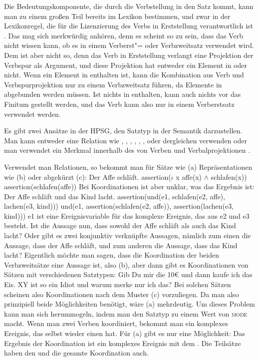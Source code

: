 Die Bedeutungskomponente, die durch die Verbstellung in den Satz kommt, kann man zu einem
großen Teil bereits im Lexikon bestimmen, und zwar in der Lexikonregel, die für die Lizenzierung
des Verbs in Erststellung verantwortlich ist \citep[]{Kiss95b}. Das mag sich merkwürdig anhören, denn es scheint
so zu sein, dass das Verb nicht wissen kann, ob es in einem Verberst"= oder Verbzweitsatz verwendet
wird. Dem ist aber nicht so, denn das Verb in Erststellung verlangt eine Projektion der Verbspur
als Argument, und diese Projektion hat entweder ein Element in \slasch oder nicht. Wenn ein Element
in \slasch enthalten ist, kann die Kombination aus Verb und Verbspurprojektion nur zu einem Verbzweitsatz
führen, da Elemente in \slasch abgebunden werden müssen. Ist nichts in \slasch enthalten, kann auch nichts
vor das Finitum gestellt werden, und das Verb kann also nur in einem Verberstsatz verwendet werden.

Es gibt zwei Ansätze in der HPSG, den Satztyp in der Semantik darzustellen. Man kann entweder eine
Relation wie , , ,
, , ,  oder dergleichen verwenden
\parencites[378, 380]{GSag2000a-u}[59]{Kathol2001a}[Abschnitt~6.1.4]{mrs}{MuellerSatztypen} oder
man verwendet ein Merkmal innerhalb des \indexwes von Verben und Verbalprojektionen
\parencites[107]{SagW99a-u}[144, 170]{Kathol2000a}.
\largerpage

Verwendet man Relationen, so bekommt man für Sätze wie (a) Repräsentationen wie (b)
oder abgekürzt (c):
\eal
\ex Der Affe schläft.
\ex assertion($\iota$ x affe(x) $\wedge{}$ schlafen(x))
\ex assertion(schlafen(affe))
\zl
Bei Koordinationen ist aber unklar, was das Ergebnis ist:
\eal
\ex Der Affe schläft und das Kind lacht.
\ex assertion(und(e1, schlafen(e2, affe), lachen(e3, kind)))
\ex und(e1, assertion(schlafen(e2, affe)), assertion(lachen(e3, kind)))
\zl
e1 ist eine Ereignisvariable für das komplexe Ereignis, das aus e2 und e3 besteht.
Ist die Aussage nun, dass sowohl der Affe schläft als auch das Kind lacht? Oder gibt es zwei konjunktiv
verknüpfte Aussagen, nämlich zum einen die Aussage, dass der Affe schläft, und zum anderen die
Aussage, dass das Kind lacht? Eigentlich möchte man sagen, dass die Koordination der beiden
Verbzweitsätze eine Aussage ist, also (b), aber dann gibt es Koordinationen von Sätzen mit
verschiedenen Satztypen:
\eal
\ex Gib Du mir die 10€ und dann kaufe ich das Eis.
\ex XY ist so ein Idiot und warum merke nur ich das?
\zl
Bei solchen Sätzen scheinen also Koordinationen nach dem Muster (c) vorzuliegen. Da man also
prinzipiell beide Möglichkeiten benötigt, wäre (a) mehrdeutig. Um dieses Problem kann man
sich herummogeln, indem man den Satztyp zu einem Wert von \textsc{mode} macht. Wenn man zwei Verben
koordiniert, bekommt man ein komplexes Ereignis, das selbst wieder einen \modew hat. Für (a)
gibt es nur eine Möglichkeit: Das Ergebnis der Koordination ist ein komplexes Ereignis mit dem
\modew {}. Die Teilsätze haben den \modew {} und die gesamte Koordination auch.

